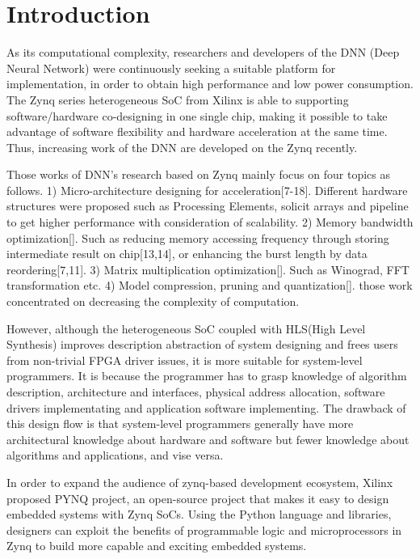 \section{Introduction}
As its computational complexity, researchers and developers of the DNN (Deep Neural Network) were continuously seeking a suitable platform for implementation, in order to obtain high performance and low power consumption. The Zynq series heterogeneous SoC from Xilinx is able to supporting software/hardware co-designing in one single chip, making it possible to take advantage of software flexibility and hardware acceleration at the same time. Thus, increasing work of the DNN are developed on the Zynq recently. 

Those works of DNN's research based on Zynq mainly focus on four topics as follows. 
1) Micro-architecture designing for acceleration[7-18]. Different hardware structures were proposed such as Processing Elements, solicit arrays and pipeline to get higher performance with consideration of scalability. 
2) Memory bandwidth optimization[]. Such as reducing memory accessing frequency through storing intermediate result on chip[13,14], or enhancing the burst length by data reordering[7,11].
3) Matrix multiplication optimization[]. Such as Winograd, FFT transformation etc.
4) Model compression, pruning and quantization[]. those work concentrated on decreasing the complexity of computation.

However, although the heterogeneous SoC coupled with HLS(High Level Synthesis) improves description abstraction of system designing and frees users from non-trivial FPGA driver issues, it is more suitable for system-level programmers. It is because the programmer has to grasp knowledge of algorithm description, architecture and interfaces, physical address allocation, software drivers implementating and application software implementing. The drawback of this design flow is that system-level programmers generally have more architectural knowledge about hardware and software but fewer knowledge about algorithms and applications, and vise versa.

In order to expand the audience of zynq-based development ecosystem, Xilinx proposed PYNQ project, an open-source project that makes it easy to design embedded systems with Zynq SoCs. Using the Python language and libraries, designers can exploit the benefits of programmable logic and microprocessors in Zynq to build more capable and exciting embedded systems.

